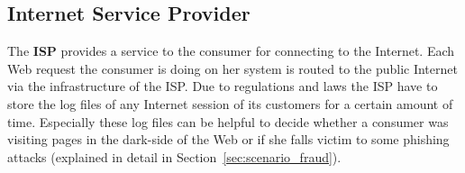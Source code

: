 
\subsection{Internet Service Provider}
\label{subsec:stakeholder_isp}

The \textbf{ISP} provides a service to the consumer for connecting to the Internet. Each Web request the consumer is doing on her system is routed to the public Internet via the infrastructure of the \gls{ISP}. Due to regulations and laws the \gls{ISP} have to store the log files of any Internet session of its customers for a certain amount of time. Especially these log files can be helpful to decide whether a consumer was visiting pages in the dark-side of the Web or if she falls victim to some phishing attacks (explained in detail in Section~\ref{sec:scenario_fraud}).


